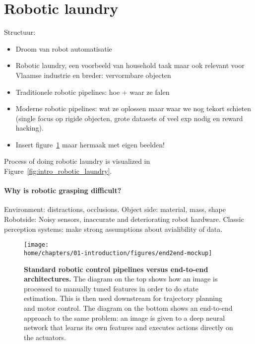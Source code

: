 \documentclass[\home/main.tex]{subfiles}
\begin{document}
\section{Robotic laundry}
Structuur:
\begin{itemize}
    \item Droom van robot automatisatie
    \item Robotic laundry, een voorbeeld van household taak maar ook relevant voor Vlaamse industrie en breder: vervormbare objecten
    \item Traditionele robotic pipelines: hoe + waar ze falen
    \item Moderne robotic pipelines: wat ze oplossen maar waar we nog tekort schieten (single focus op rigide objecten, grote datasets of veel exp nodig en reward hacking).
    \item Insert figure~\ref{fig:intro_end2end} maar hermaak met eigen beelden!
\end{itemize}

Process of doing robotic laundry is visualized in Figure~\ref{fig:intro_robotic_laundry}.


\paragraph{Why is robotic grasping difficult?}
Environment: distractions, occlusions.
Object side: material, mass, shape
Robotside: Noisy sensors, inaccurate and deteriorating robot hardware.
Classic perception systems: make strong assumptions about avialibility of data. 

\begin{figure}
    \texttt{[image: \\home/chapters/01-introduction/figures/end2end-mockup]}
    \caption{\textbf{Standard robotic control pipelines versus end-to-end architectures.} The diagram on the top shows how an image is processed to manually tuned features in order to do state estimation. This is then used downstream for trajectory planning and motor control. The diagram on the bottom shows an end-to-end approach to the same problem: an image is given to a deep neural network that learns its own features and executes actions directly on the actuators.}
    \label{fig:intro_end2end}
\end{figure}
\end{document}
